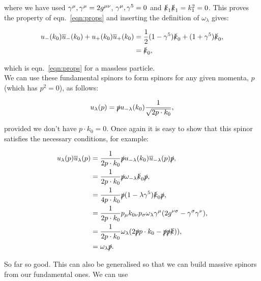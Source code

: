 		where we have used ${\gamma^{\mu}, \gamma^{\mu}}=2g^{\mu\nu}$, ${\gamma^{\mu}, \gamma^{5}}=0$ and $\slashed k_1\slashed k_1=k_1^2=0$.
		This proves the property of eqn.~\eqref{eqn:props} and inserting the definition of $\omega_\lambda$ gives:

		\begin{subequations}
		\begin{align*}
			u_-(k_0)\overline{u}_-(k_0) + u_+(k_0)\overline{u}_+(k_0) &= \frac{1}{2}(1-\gamma^{5})\slashed k_0 + (1+\gamma^{5})\slashed k_0,\\
			&= \slashed k_0,
		\end{align*}
		\end{subequations}

		which is eqn.~\eqref{eqn:props} for a massless particle.\\We can use these fundamental spinors
		to form spinors for any given momenta, $p$ (which has $p^2=0$), as follows:

		\begin{equation}
			u_\lambda(p) = \slashed p u_{-\lambda}(k_0) \frac{1}{\sqrt{2p\cdot k_0}},
		\end{equation}

		provided we don't have $p\cdot k_0=0$.  Once again it is easy to show that this spinor satisfies the necessary conditions, for example:

		\begin{subequations}
		\begin{align*}
			u_\lambda(p)\overline{u}_\lambda(p) &= \frac{1}{2p\cdot k_0}\slashed p u_{-\lambda}(k_0)\overline{u}_{-\lambda}(p)\slashed p,\\
			&= \frac{1}{2p\cdot k_0}\slashed p \omega_{-\lambda}\slashed k_0\slashed p,\\
			&= \frac{1}{4p\cdot k_0}\slashed p (1-\lambda\gamma^{5})\slashed k_0\slashed p,\\
			&= \frac{1}{2p\cdot k_0}p_{\mu}k_{0\nu}p_{\sigma}\omega_{\lambda}\gamma^{\mu}(2g^{\nu\sigma} - \gamma^{\sigma}\gamma^{\nu}),\\
			&= \frac{1}{2p\cdot k_0}\omega_\lambda(2\slashed p p\cdot k_0 - \slashed p\slashed p\slashed k)),\\
			&= \omega_\lambda\slashed p.\\
		\end{align*}
		\end{subequations}

		So far so good.  This can also be generalised so that we can build massive spinors from our fundamental ones.  We can use

